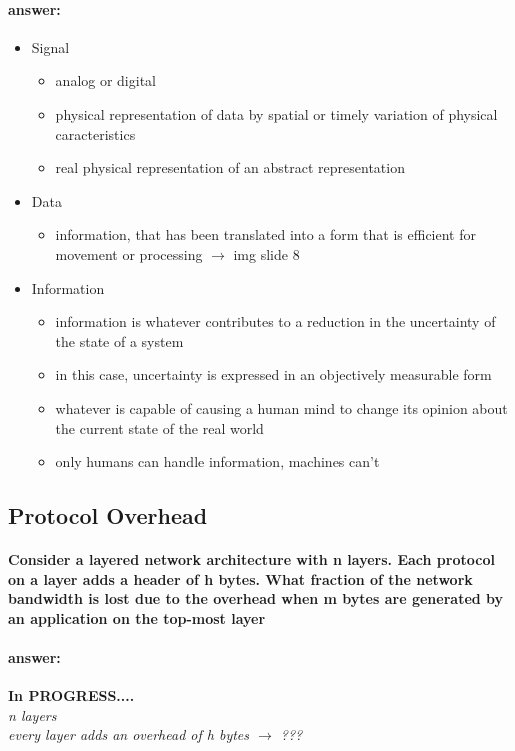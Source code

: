 \documentclass[a4paper,12pt]{article}
\begin{document}
 \paragraph{answer:}
 \begin{itemize}
 	\item Signal
 	\begin{itemize}
 		\item  analog or digital
 		\item  physical representation of data by spatial or timely variation of physical caracteristics
 		\item  real physical representation of an abstract representation
 	\end{itemize}
 
 	\item Data
 	\begin{itemize}
 		\item  information, that has been translated into a form that is efficient for movement or processing
 		$\rightarrow$ img slide 8 
 	\end{itemize}
 
 	\item Information
 	\begin{itemize}
 		\item  information is whatever contributes to a reduction in the uncertainty of the state of a system
 		\item  in this case, uncertainty is expressed in an objectively measurable form
 		\item  whatever is capable of causing a human mind to change its opinion about the current state of the real world
 		\item  only humans can handle information, machines can't
 	\end{itemize}
 \end{itemize}
 
  \subsection{Protocol Overhead}
 \paragraph{Consider a layered network architecture with n layers. Each protocol on a layer adds a header of h bytes. What fraction of the network bandwidth is lost due to the overhead when m bytes are generated by an application on the top-most layer}
 \paragraph{answer:}

  \textbf{In PROGRESS....} \\
  \textit{n layers \\
 every layer adds an overhead of h bytes $\rightarrow$ ???}

 
\end{document}

